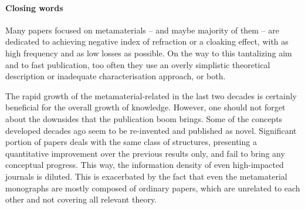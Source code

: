 


\paragraph{Closing words} %

Many papers focused on metamaterials -- and maybe majority of them -- are dedicated to achieving negative index of refraction or a cloaking effect, with as high frequency and as low losses as possible.
On the way to this tantalizing aim and to fast publication, too often they use an overly simplistic theoretical description or inadequate characterisation approach, or both. %

The rapid growth of the metamaterial-related in the last two decades is certainly beneficial for the overall growth of knowledge. However, one should not forget about the downsides that the publication boom brings. Some of the concepts developed decades ago seem to be re-invented and published as novel. Significant portion of papers deals with the same class of structures, presenting a quantitative improvement over the previous results only, and fail to bring any conceptual progress. This way, the information density of even high-impacted journals is diluted. This is exacerbated by the fact that even the metamaterial monographs are mostly composed of ordinary papers, which are unrelated to each other and not covering all relevant theory.

